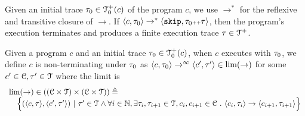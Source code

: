 Given an initial trace $\mathtt{\tau}_0 \in \mathcal{T}^{+}_0(c)$ of the program $c$,
we use $\to^*$ for the reflexive and transitive closure of $\to$. 
If $\langle c, \mathtt{\tau}_0 \rangle \rightarrow^{*} \langle \mathtt{skip}, \mathtt{\tau}_0 {\scriptscriptstyle ++} \mathtt{\tau} \rangle$,
then the program's execution terminates and produces a finite execution trace $\mathtt{\tau} \in \mathcal{T}^{+}$.
\\
\begin{defn}
  \label{def:non-terminating}
  Given a program $c$ and an initial trace $\mathtt{\tau}_0 \in \mathcal{T}^{+}_0(c)$,
  when $c$ executes with $\mathtt{\tau}_0$,  we define $c$ is non-terminating under $\mathtt{\tau}_0$ as 
  $\langle c, \mathtt{\tau}_0 \rangle \rightarrow^{\infty} \langle c', \mathtt{\tau}' \rangle \in \lim(\to)$ for some $c' \in \mathcal{C}, \mathtt{\tau}' \in \mathcal{T}$
  where the limit is 
  \[
    \begin{array}{l}
      \lim(\to) \in \left( (\cdom \times \tdom) \times (\cdom \times \tdom) \right) \triangleq 
    \\ \quad
    \Big\{
      (\config{c, \trace}, \config{c', \trace'}) ~\vert~ \trace' \in \tdom
      \land \forall i \in \mathbb{N}, \exists \trace_i, \trace_{i + 1} \in \tdom, c_i, c_{i + 1} \in \cdom \st 
      \config{c_i, \trace_i} \to \config{c_{i + 1}, \trace_{i + 1}}  
    \Big\}
    \end{array}
  \]
\end{defn}
%
